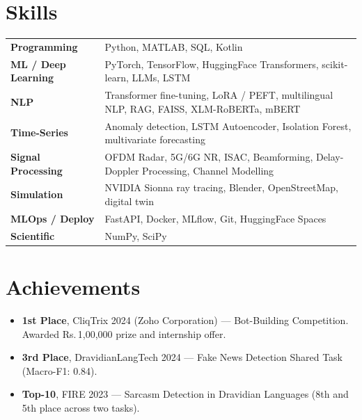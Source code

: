 \documentclass[10pt, a4paper]{article}
\newcommand{\entryspace}{\vspace{6pt}}
\newcommand{\sectionspace}{\vspace{2pt}}
\begin{document}
\entryspace

\section{Skills}
\sectionspace

\begin{tabularx}{\textwidth}{@{}>{\bfseries}l X@{}}
    Programming        & Python, MATLAB, SQL, Kotlin \\[2pt]
    ML / Deep Learning & PyTorch, TensorFlow, HuggingFace Transformers, scikit-learn, LLMs, LSTM \\[2pt]
    NLP                & Transformer fine-tuning, LoRA / PEFT, multilingual NLP, RAG, FAISS, XLM-RoBERTa, mBERT \\[2pt]
    Time-Series        & Anomaly detection, LSTM Autoencoder, Isolation Forest, multivariate forecasting \\[2pt]
    Signal Processing  & OFDM Radar, 5G/6G NR, ISAC, Beamforming, Delay-Doppler Processing, Channel Modelling \\[2pt]
    Simulation         & NVIDIA Sionna ray tracing, Blender, OpenStreetMap, digital twin \\[2pt]
    MLOps / Deploy     & FastAPI, Docker, MLflow, Git, HuggingFace Spaces \\[2pt]
    Scientific         & NumPy, SciPy \\
\end{tabularx}

\entryspace

\section{Achievements}
\sectionspace

\begin{itemize}
    \item \textbf{1st Place}, CliqTrix 2024 (Zoho Corporation) --- Bot-Building Competition. Awarded Rs.\,1,00,000 prize and internship offer.
    \item \textbf{3rd Place}, DravidianLangTech 2024 --- Fake News Detection Shared Task (Macro-F1: 0.84).
    \item \textbf{Top-10}, FIRE 2023 --- Sarcasm Detection in Dravidian Languages (8th and 5th place across two tasks).
\end{itemize}
\end{document}
